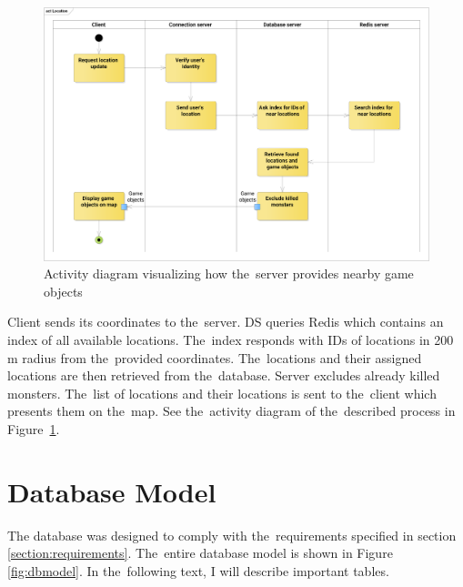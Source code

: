 	\begin{figure}[h]	
		\includegraphics[width=\textwidth]{figures/AD_Location}
		\centering			
		\caption{Activity diagram visualizing how the~server provides nearby game objects}
		\label{fig:adlocation}
	\end{figure} 
	
	Client sends its coordinates to the~server. DS queries Redis which contains an index of all available locations. The~index responds with IDs of locations in 200 m radius from the~provided coordinates. The~locations and their assigned locations are then retrieved from the~database. Server excludes already killed monsters. The~list of locations and their locations is sent to the~client which presents them on the~map. See the~activity diagram of the~described process in Figure~\ref{fig:adlocation}.		

\section{Database Model}
	The database was designed to comply with the~requirements specified in section \ref{section:requirements}. The~entire database model is shown in Figure \ref{fig:dbmodel}. In the~following text, I will describe important tables.	
	
